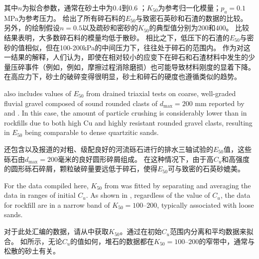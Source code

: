 \begin{ParaColumn}
    \switchcolumn

    \noindent
    其中$n$为拟合参数，通常在砂土中为0.4到0.6 \citep{Schanz1998383,Schanz1999281}；$K_{50}$为参考归一化模量；$p_a=0.1$MPa为参考压力。 给出了所有碎石料的$E_{50}$与致密石英砂和石渣的数据的比较。 另外，的绘制假设$n=0.5$以及疏砂和密砂的$K_{50}$的典型值分别为200和400\citep{Schanz1998383}。 比较结果表明，大多数碎石料的模量均低于散砂。 相比之下，低压下的石渣的$E_{50}$与密砂的值相似，但在100-200kPa的中间压力下，往往处于碎石的范围内。 作为对这一结果的解释，人们认为，即使在相对较小的应变下在碎石和石渣材料中发生的少量压碎事件（例如，例如，摩擦过程消除磨损）也可能导致材料刚度的显着下降。 在高应力下，砂土的破碎变得很明显，砂土和碎石的硬度也遵循类似的趋势。

    \CrossColumnText{
        
    }

    \switchcolumn*

     also includes values of $E_{50}$ from drained triaxial tests on coarse, well-graded fluvial gravel composed of sound rounded clasts of $d_{\max}=200$ mm reported by \citet{DelaHozAlvarez2007} and \citet{Verdugo2007243}. In this case, the amount of particle crushing is considerably lower than in rockfills due to both high Cu and highly resistant rounded gravel clasts, resulting in $E_{50}$ being comparable to dense quartzitic sands.

    \switchcolumn

    还包含\citet{DelaHozAlvarez2007}以及\citet{Verdugo2007243}报道的对粗、级配良好的河流砾石进行的排水三轴试验的$E_{50}$值，这些砾石由$d_{\max}=200$毫米的良好圆形碎屑组成。 在这种情况下，由于高$C_u$和高强度的圆形砾石碎屑，颗粒破碎量要远低于碎石，使得$E_{50}$可与致密的石英砂媲美。

    \switchcolumn*

    For the data compiled here, $K_{50}$ from  was fitted by separating and averaging the data in ranges of initial $C_u$. As shown in , regardless of the value of $C_u$, the data for rockfill are in a narrow band of $K_{50}=100–200$, typically associated with loose sands.

    \switchcolumn

    对于此处汇编的数据，请从中获取$K_{50}$。通过在初始$C_u$范围内分离和平均数据来拟合。 如所示，无论$C_u$的值如何，堆石的数据都在$K_{50}=100–200$的窄带中，通常与松散的砂土有关。
    
\end{ParaColumn}